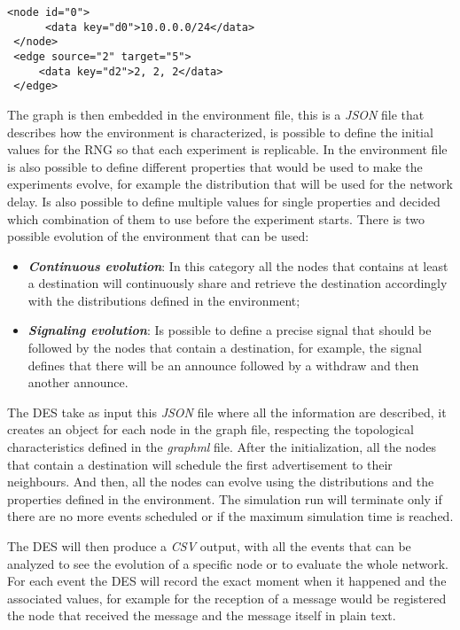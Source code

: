 \begin{lstlisting}[language=graphml, caption=Graph example, label=lst:graph_example]
 <node id="0">
      <data key="d0">10.0.0.0/24</data>
 </node>
 <edge source="2" target="5">
     <data key="d2">2, 2, 2</data>
 </edge>
\end{lstlisting}

The graph is then embedded in the environment file, this is a \textit{JSON} file
that describes how the environment is characterized, is possible to define the
initial values for the \ac{RNG} so that each experiment is replicable.
In the environment file is also possible to define different properties that
would be used to make the experiments evolve, for example the distribution that
will be used for the network delay.
Is also possible to define multiple values for single properties and decided which
combination of them to use before the experiment starts.
There is two possible evolution of the environment that can be used:
\begin{itemize}
    \item \textbf{\textit{Continuous evolution}}: In this category all the nodes
    that contains at least a destination will continuously share and retrieve
    the destination accordingly with the distributions defined in the environment;
    \item \textbf{\textit{Signaling evolution}}: Is possible to define a precise
    signal that should be followed by the nodes that contain a destination, for
    example, the signal  defines that there will be an announce followed by
    a withdraw and then another announce.
\end{itemize}

The \ac{DES} take as input this \textit{JSON} file where all the information
are described, it creates an object for each node in the graph file, respecting
the topological characteristics defined in the \textit{graphml} file.
After the initialization, all the nodes that contain a destination will schedule
the first advertisement to their neighbours.
And then, all the nodes can evolve using the distributions and the properties
defined in the environment.
The simulation run will terminate only if there are no more events scheduled or
if the maximum simulation time is reached.

The \ac{DES} will then produce a \textit{CSV} output, with all the events that
can be analyzed to see the evolution of a specific node or to evaluate the
whole network.
For each event the \ac{DES} will record the exact moment when it happened and
the associated values, for example for the reception of a message would be registered
the node that received the message and the message itself in plain text.

